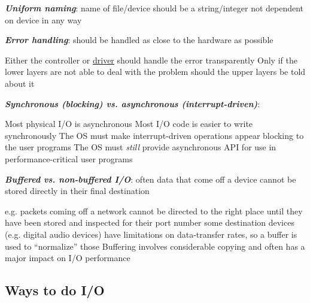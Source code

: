\textbf{\textit{Uniform naming}}: name of
                    file/device should be a string/integer not dependent on device in
                    any way
                    
                    
\textbf{ \textit{Error handling}}: should be handled as close to the hardware as possible
\begin{enumerate}
    \vItem
    Either the controller or \ul{driver}
    should handle the error transparently
\vItem
    Only if the lower layers are not able to deal with the problem should
    the upper layers be told about it 
\end{enumerate}
          
\textbf{ \textit{Synchronous (blocking)
                  vs. asynchronous (interrupt-driven)}}:
\begin{enumerate}
    \vItem
    Most physical I/O is asynchronous
\vItem
    Most I/O code is easier to write synchronously
\vItem
    The OS must make interrupt-driven operations appear blocking to the
    user programs
\vItem
    The OS must  \textit{still} provide asynchronous API for use in
    performance-critical user programs 
\end{enumerate}
          
          
\textbf{ \textit{Buffered
                  vs. non-buffered I/O}}: often data that come off a device cannot be
          stored directly in their final destination
\begin{enumerate}
    \vItem
          e.g. packets coming off a network cannot be directed to the right
          place until they have been stored and inspected for their port number
    \vItem
          some destination devices (e.g. digital audio devices) have limitations
          on data-transfer rates, so a buffer is used to ``normalize'' those
    \vItem
          Buffering involves considerable copying and often has a major impact
          on I/O performance
\end{enumerate}


\subsection*{Ways to do I/O}

